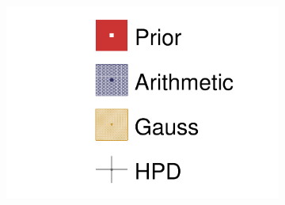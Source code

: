 \begin{figure}[h]
	\centering
	\begin{subfigure}[t]{0.10\textwidth}
		\includegraphics[width=\textwidth,page=1, trim={0mm 0mm 0mm 9mm}, clip]{figures/mach3/2018/asimov/2018a_MultiPi_Binningv6_NewCov_Asimov_NoDet_merge_drawPar}
	\end{subfigure}
	

\end{figure}
